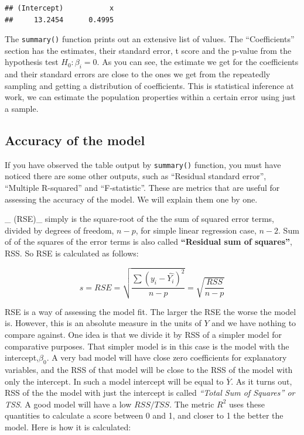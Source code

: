 \documentclass[12pt,]{krantz}
\begin{document}
\begin{verbatim}
## (Intercept)           x 
##     13.2454      0.4995
\end{verbatim}

The \texttt{summary()} function prints out an extensive list of values.
The ``Coefficients'' section has the estimates, their standard error, t score
and the p-value from the hypothesis test \(H_0:\beta_i=0\). As you can see, the
estimate we get for the coefficients and their standard errors are close to
the ones we get from the repeatedly sampling and getting a distribution of
coefficients. This is statistical inference at work, we can estimate the
population properties within a certain error using just a sample.

\hypertarget{accuracy-of-the-model}{%
\subsection{Accuracy of the model}\label{accuracy-of-the-model}}

If you have observed the table output by \texttt{summary()} function, you must have noticed there are some other outputs, such as ``Residual standard error'',
``Multiple R-squared'' and ``F-statistic''. These are metrics that are useful
for assessing the accuracy of the model. We will explain them one by one.

\_ (RSE)\_ simply is the square-root of the
the sum of squared error terms, divided by degrees of freedom, \(n-p\), for simple
linear regression case, \(n-2\). Sum of of the squares of the error terms is also
called \textbf{``Residual sum of squares''}, RSS. So RSE is
calculated as follows:

\[ s=RSE=\sqrt{\frac{\sum{(y_i-\hat{Y_i})^2 }}{n-p}}=\sqrt{\frac{RSS}{n-p}}\]

RSE is a way of assessing the model fit. The larger the RSE the worse the
model is. However, this is an absolute measure in the units of \(Y\) and we have nothing to
compare against. One idea is that we divide it by RSS of a simpler model
for comparative purposes. That simpler model is in this case is the model
with the intercept,\(\beta_0\). A very bad model will have close zero
coefficients for explanatory variables, and the RSS of that model
will be close to the RSS of the model with only the intercept. In such
a model intercept will be equal to \(\overline{Y}\). As it turns out, RSS of
the the model with
just the intercept is called \emph{``Total Sum of Squares'' or TSS}. A good model will have a low \(RSS/TSS\). The metric \(R^2\) uses these quantities to calculate a score between 0 and 1, and closer to 1 the better the model. Here is how
it is calculated:
\end{document}
